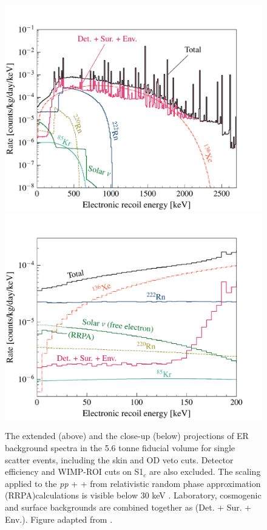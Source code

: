 %
\begin{figure}[t!]
    \centering
    \includegraphics[scale=0.5]{Chapter_5/Figures/er_background_spectrum.pdf}
    \includegraphics[scale=0.5]{Chapter_5/Figures/er_background_spectrum_zoomed.pdf}
    \caption[The extended (above) and the close-up (below) projections of ER background spectra in the 5.6 tonne fiducial volume for single scatter events, including the skin and OD veto cuts.]%
    {The extended (above) and the close-up (below) projections of ER background spectra in the 5.6 tonne fiducial volume for single scatter events, including the skin and OD veto cuts. Detector efficiency and WIMP-ROI cuts on S1$_{c}$ are also excluded. The scaling applied to the \textit{pp} + \BeS{} + \NOT{} from relativistic random phase approximation (RRPA)calculations is visible below 30 keV \cite{Chen_2017}. Laboratory, cosmogenic and surface backgrounds are combined together as (Det. + Sur. + Env.). Figure adapted from \cite{akerib2018projected}.}
    \label{fig:lz_er_spectrum}
\end{figure}
%


